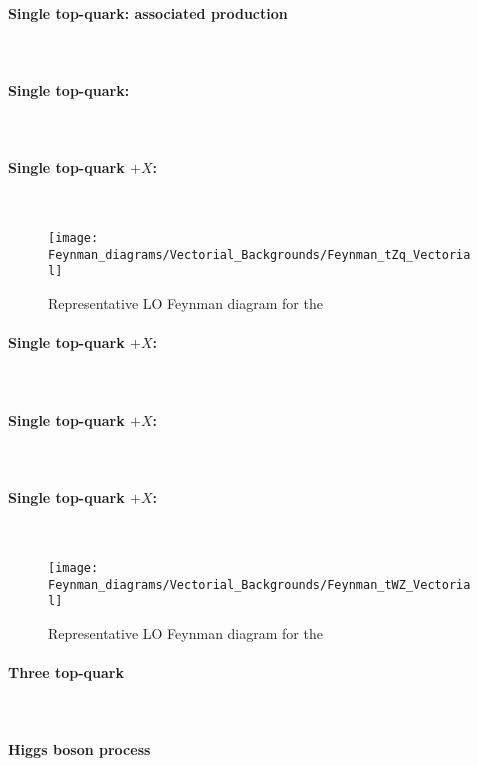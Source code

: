 \paragraph{Single top-quark: \tW associated production}\mbox{}\\
\paragraph{Single top-quark: \schannel}\mbox{}\\


\paragraph{Single top-quark $+X$: \tZq}\mbox{}\\
\begin{figure}[htbp!]
\centering
\texttt{[image: Feynman\_diagrams/Vectorial\_Backgrounds/Feynman\_tZq\_Vectorial]}
\caption{Representative LO Feynman diagram for the \tZq}
\label{fig:tHq:Backgrounds:Feynman_tZq}
\end{figure}



\paragraph{Single top-quark $+X$: \tWH}\mbox{}\\
\paragraph{Single top-quark $+X$: \tWZ}\mbox{}\\

\paragraph{Single top-quark $+X$: \tZq}\mbox{}\\
\begin{figure}[htbp!]
\centering
\texttt{[image: Feynman\_diagrams/Vectorial\_Backgrounds/Feynman\_tWZ\_Vectorial]}
\caption{Representative LO Feynman diagram for the \tWZ}
\label{fig:tHq:Backgrounds:Feynman_tWz}
\end{figure}


\paragraph{Three top-quark}\mbox{}\\
\paragraph{Higgs boson process}\mbox{}\\


